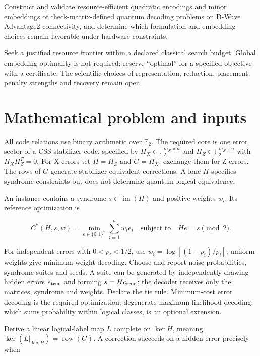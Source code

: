 \documentclass[11pt,letterpaper]{article}
\begin{document}
Construct and validate resource-efficient quadratic encodings and minor embeddings of check-matrix-defined quantum decoding problems on D-Wave Advantage2 connectivity, and determine which formulation and embedding choices remain favorable under hardware constraints.\par

Seek a justified resource frontier within a declared classical search budget. Global embedding optimality is not required; reserve “optimal” for a specified objective with a certificate. The scientific choices of representation, reduction, placement, penalty strengths and recovery remain open.\par

\section{Mathematical problem and inputs}

All code relations use binary arithmetic over $\mathbb F_2$. The required core is one error sector of a CSS stabilizer code, specified by $H_X\in\mathbb F_2^{m_X\times n}$ and $H_Z\in\mathbb F_2^{m_Z\times n}$ with $H_XH_Z^T=0$. For X errors set $H=H_Z$ and $G=H_X$; exchange them for Z errors. The rows of $G$ generate stabilizer-equivalent corrections. A lone $H$ specifies syndrome constraints but does not determine quantum logical equivalence.\par

An instance contains a syndrome $s\in\operatorname{im}(H)$ and positive weights $w_i$. Its reference optimization is\par

\[C^*(H,s,w)=\min_{e\in\{0,1\}^n}\sum_{i=1}^n w_i e_i\quad\text{subject to}\quad He=s\pmod 2.\]

For independent errors with $0<p_i<1/2$, use $w_i=\log[(1-p_i)/p_i]$; uniform weights give minimum-weight decoding. Choose and report noise probabilities, syndrome suites and seeds. A suite can be generated by independently drawing hidden errors $e_{\rm true}$ and forming $s=He_{\rm true}$; the decoder receives only the matrices, syndrome and weights. Declare the tie rule. Minimum-cost error decoding is the required optimization; degenerate maximum-likelihood decoding, which sums probability within logical classes, is an optional extension.\par

Derive a linear logical-label map $L$ complete on $\ker H$, meaning $\ker(L|_{\ker H})=\operatorname{row}(G)$. A correction succeeds on a hidden error precisely when\par
\end{document}
